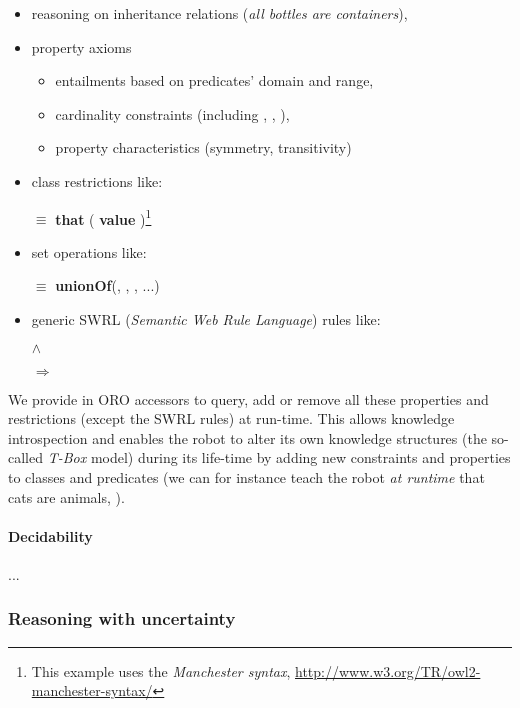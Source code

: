 \begin{itemize}
	\item reasoning on inheritance relations (\eg \emph{all bottles are containers}),
	\item property axioms
		\begin{itemize}
		\item entailments based on predicates' domain and range,
		\item cardinality constraints (including , 
		, ),
		\item property characteristics (symmetry, transitivity)
		\end{itemize}
	\item class restrictions like: \par \footnotesize {} $\equiv$
		 {\bf that} ( {\bf value}
		)\footnote{This example uses the \emph{Manchester
		syntax}, \url{http://www.w3.org/TR/owl2-manchester-syntax/}} \normalsize
	\item set operations like: \par \footnotesize {} $\equiv$ {\bf unionOf}(,
		, , ...) \normalsize
	\item generic SWRL ({\em Semantic Web Rule Language}) rules like: \par
		\footnotesize {} $\land$
		 \par $\Rightarrow$ 
		\normalsize 
	\end{itemize}

We provide in ORO accessors to query, add or remove all these properties and
restrictions (except the SWRL rules) at run-time. This allows knowledge
introspection and enables the robot to alter its own knowledge structures (the
so-called \emph{T-Box} model) during its life-time by adding new constraints
and properties to classes and predicates (we can for instance teach the robot
\emph{at runtime} that cats are animals, \ie {}).


\paragraph{Decidability}

...


\subsubsection{Reasoning with uncertainty}
